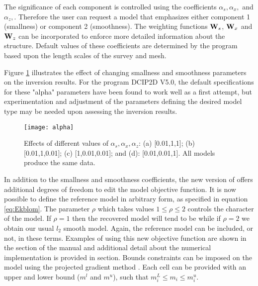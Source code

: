 The significance of each component is controlled using the  coefficients $\alpha_s, \alpha_x,$ and $\alpha_z,$. Therefore the user can request a model that emphasizes either component 1 (smallness) or component 2 (smoothness). The weighting functions $\mathbf{W}_s$, $\mathbf{W}_x$ and $\mathbf{W}_z$ can be incorporated to enforce more detailed information about the structure. Default values of these coefficients are determined by the program based upon the length scales of the survey and mesh.

Figure \ref{fig:alphaFig} illustrates the effect of changing smallness and smoothness parameters on the inversion results. For the program DCIP2D V5.0, the default specifications for these "alpha" parameters have been found to work well as a first attempt, but experimentation and adjustment of the parameters defining the desired model type may be needed upon assessing the inversion results.
%
\begin{figure}
\centering
\texttt{[image: alpha]}
\caption{Effects of different values of $\alpha_s, \alpha_x, \alpha_z$: (a) [0.01,1,1]; (b) [0.01,1,0.01]; (c) [1,0.01,0.01]; and (d): [0.01,0.01,1]. All models produce the same data.}
\label{fig:alphaFig}
\end{figure}

In addition to the smallness and smoothness coefficients, the new version of  offers additional degrees of freedom to edit the model objective function. It is now possible to define the reference model in arbitrary form, as specified in equation \ref{eq:Ekblom}. The parameter $\rho$ which takes values $1\leq\rho\leq2$ controls the character of the model. If $\rho=1$ then the recovered model will tend to be  while if $\rho=2$ we obtain our usual $l_2$ smooth model. Again, the reference model can be included, or not, in these terms. Examples of using this new objective function are shown in the  section of the manual and additional detail about the numerical implementation is provided in  section. Bounds constraints can be imposed on the model using the projected gradient method \cite[]{CalamaiMore87}. Each cell can be provided with an upper and lower bound ($m^l$ and $m^u$), such that $m^L_i\le m_i \le m^u_i$.

